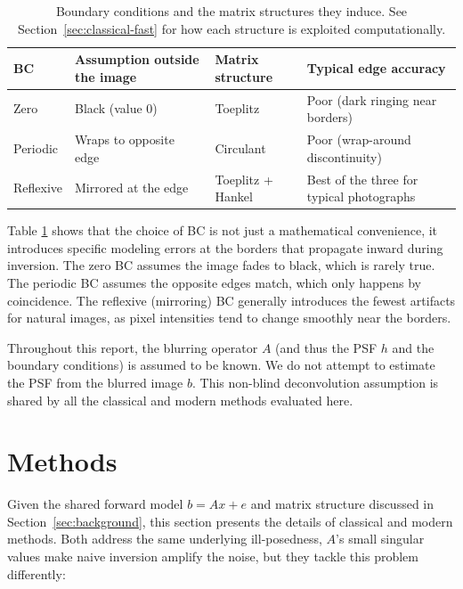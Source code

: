 \documentclass[12pt, a4paper, onecolumn]{article}
\theoremstyle{plain}          %
\theoremstyle{definition}     %
\theoremstyle{remark}
\begin{document}
\begin{table}[H]
\centering
\footnotesize
\begin{tabular}{p{1.5cm}p{3.3cm}p{3cm}p{5.5cm}}
\toprule
\textbf{BC} & \textbf{Assumption outside the image} & \textbf{Matrix structure} & \textbf{Typical edge accuracy} \\
\midrule
Zero & Black (value 0) & Toeplitz & Poor (dark ringing near borders) \\
Periodic & Wraps to opposite edge & Circulant & Poor (wrap-around discontinuity) \\
Reflexive & Mirrored at the edge & Toeplitz + Hankel & Best of the three for typical photographs \\
\bottomrule
\end{tabular}
\caption{Boundary conditions and the matrix structures they induce. See
Section~\ref{sec:classical-fast} for how each structure is exploited
computationally.}
\label{tab:bc}
\end{table}

Table \ref{tab:bc} shows that the choice of BC is not just a mathematical convenience, it introduces specific modeling errors at the borders that propagate inward during inversion. The zero BC assumes the image fades to black, which is rarely true. The periodic BC assumes the opposite edges match, which only happens by coincidence. The reflexive (mirroring) BC generally introduces the fewest artifacts for natural images, as pixel intensities tend to change smoothly near the borders.

Throughout this report, the blurring operator $A$ (and thus the PSF $h$ and the boundary conditions) is assumed to be known. We do not attempt to estimate the PSF from the blurred image $b$. This non-blind deconvolution assumption is shared by all the classical and modern methods evaluated here.

\section{Methods}
\label{sec:methods}

Given the shared forward model $b=Ax+e$ and matrix structure discussed in Section~\ref{sec:background}, this section presents the details of classical and modern methods. Both address the same underlying
ill-posedness, $A$'s small singular values make naive inversion amplify the noise, but they tackle this problem differently:
\end{document}

